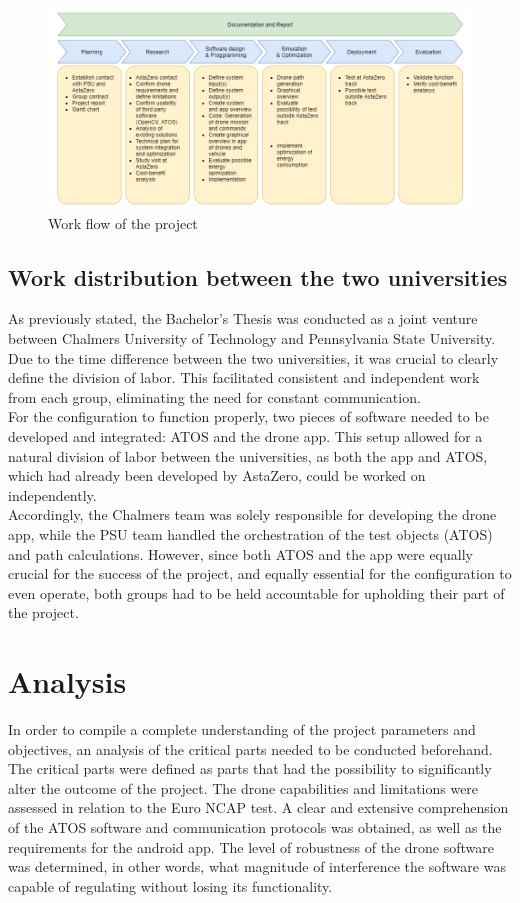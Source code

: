 \begin{figure}[H]
  \centering
  \includegraphics[width=\columnwidth]{figure/work_flow.png}
  \caption{Work flow of the project}
  \label{fig:workflow}
\end{figure}

\subsection{Work distribution between the two universities}
As previously stated, the Bachelor's Thesis was conducted as a joint venture between Chalmers University of Technology and Pennsylvania State University. Due to the time difference between the two universities, it was crucial to clearly define the division of labor. This facilitated consistent and independent work from each group, eliminating the need for constant communication.
\\

For the configuration to function properly, two pieces of software needed to be developed and integrated: ATOS and the drone app. This setup allowed for a natural division of labor between the universities, as both the app and ATOS, which had already been developed by AstaZero, could be worked on independently.
\\

Accordingly, the Chalmers team was solely responsible for developing the drone app, while the PSU team handled the orchestration of the test objects (ATOS) and path calculations. However, since both ATOS and the app were equally crucial for the success of the project, and equally essential for the configuration to even operate, both groups had to be held accountable for upholding their part of the project.

\section{Analysis}
In order to compile a complete understanding of the project parameters and objectives, an analysis of the critical parts needed to be conducted beforehand. The critical parts were defined as parts that had the possibility to significantly alter the outcome of the project. The drone capabilities and limitations were assessed in relation to the Euro NCAP test. A clear and extensive comprehension of the ATOS software and communication protocols was obtained, as well as the requirements for the android app. The level of robustness of the drone software was determined, in other words, what magnitude of interference the software was capable of regulating without losing its functionality.

